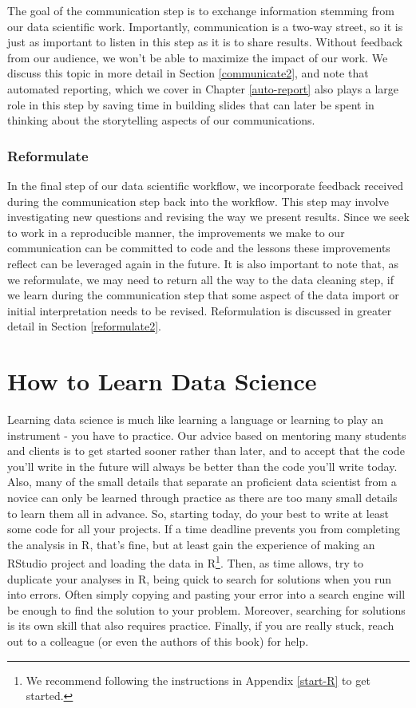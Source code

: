\documentclass[
]{krantz}
\begin{document}
The goal of the communication step is to exchange information stemming from our data scientific work. Importantly, communication is a two-way street, so it is just as important to listen in this step as it is to share results. Without feedback from our audience, we won't be able to maximize the impact of our work. We discuss this topic in more detail in Section \ref{communicate2}, and note that automated reporting, which we cover in Chapter \ref{auto-report} also plays a large role in this step by saving time in building slides that can later be spent in thinking about the storytelling aspects of our communications.

\hypertarget{reformulate}{%
\subsubsection{Reformulate}\label{reformulate}}

In the final step of our data scientific workflow, we incorporate feedback received during the communication step back into the workflow. This step may involve investigating new questions and revising the way we present results. Since we seek to work in a reproducible manner, the improvements we make to our communication can be committed to code and the lessons these improvements reflect can be leveraged again in the future. It is also important to note that, as we reformulate, we may need to return all the way to the data cleaning step, if we learn during the communication step that some aspect of the data import or initial interpretation needs to be revised. Reformulation is discussed in greater detail in Section \ref{reformulate2}.

\hypertarget{how-to-learn-data-science}{%
\section{How to Learn Data Science}\label{how-to-learn-data-science}}

Learning data science is much like learning a language or learning to play an instrument - you have to practice. Our advice based on mentoring many students and clients is to get started sooner rather than later, and to accept that the code you'll write in the future will always be better than the code you'll write today. Also, many of the small details that separate an proficient data scientist from a novice can only be learned through practice as there are too many small details to learn them all in advance. So, starting today, do your best to write at least some code for all your projects. If a time deadline prevents you from completing the analysis in R, that's fine, but at least gain the experience of making an RStudio project and loading the data in R\footnote{We recommend following the instructions in Appendix \ref{start-R} to get started.}. Then, as time allows, try to duplicate your analyses in R, being quick to search for solutions when you run into errors. Often simply copying and pasting your error into a search engine will be enough to find the solution to your problem. Moreover, searching for solutions is its own skill that also requires practice. Finally, if you are really stuck, reach out to a colleague (or even the authors of this book) for help.
\end{document}
